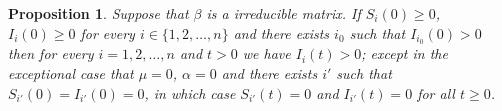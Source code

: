 \documentclass[a4paper,10pt]{article}
\newtheorem{prop}[thm]{Proposition}
\theoremstyle{remark}
\begin{document}

  
  








 

\begin{prop} Suppose that $\beta$ is a irreducible matrix. If $S_i(0)\geq 0$, $I_i(0)\geq 0$ for every $i\in\{1,2,\ldots,n\}$ and there exists $i_0$ such that $I_{i_0}(0)>0$ then for every $i=1,2,\ldots,n$ and $t>0$ we have $I_i(t)>0$; except in the exceptional case that  $\mu=0$, $\alpha=0$ and  there exists $i'$ such that $S_{i'}(0)=I_{i'}(0)=0$, in which case  
$S_{i'}(t)=0$ and $I_{i'}(t)=0$ for all $t\geq 0$.
\end{prop}
 
\end{document}
